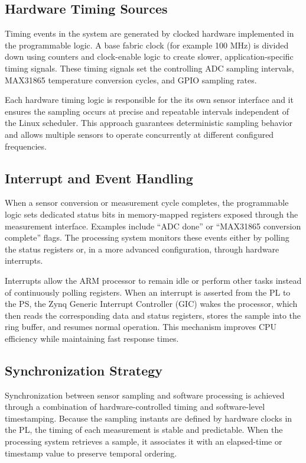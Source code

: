 \subsection{Hardware Timing Sources}
Timing events in the system are generated by clocked hardware implemented in the programmable logic. A base fabric clock (for example 100 MHz) is divided down using counters and clock-enable logic to create slower, application-specific timing signals. These timing signals set the controlling ADC sampling intervals, MAX31865 temperature conversion cycles, and GPIO sampling rates.

Each hardware timing logic is responsible for the its own sensor interface and it ensures the sampling occurs at precise and repeatable intervals independent of the Linux scheduler. This approach guarantees deterministic sampling behavior and allows multiple sensors to operate concurrently at different configured frequencies.

\subsection{Interrupt and Event Handling}
When a sensor conversion or measurement cycle completes, the programmable logic sets dedicated status bits in memory-mapped registers exposed through the measurement interface. Examples include “ADC done” or “MAX31865 conversion complete” flags. The processing system monitors these events either by polling the status registers or, in a more advanced configuration, through hardware interrupts.

Interrupts allow the ARM processor to remain idle or perform other tasks instead of continuously polling registers. When an interrupt is asserted from the PL to the PS, the Zynq Generic Interrupt Controller (GIC) wakes the processor, which then reads the corresponding data and status registers, stores the sample into the ring buffer, and resumes normal operation. This mechanism improves CPU efficiency while maintaining fast response times.

\subsection{Synchronization Strategy}
Synchronization between sensor sampling and software processing is achieved through a combination of hardware-controlled timing and software-level timestamping. Because the sampling instants are defined by hardware clocks in the PL, the timing of each measurement is stable and predictable. When the processing system retrieves a sample, it associates it with an elapsed-time or timestamp value to preserve temporal ordering.

